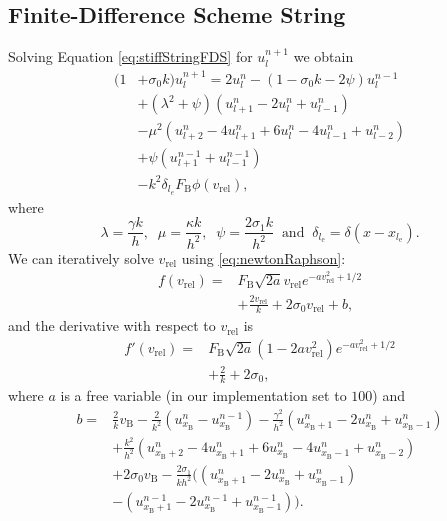 \documentclass{article}
\begin{document}
\subsection{Finite-Difference Scheme String}
Solving Equation \eqref{eq:stiffStringFDS} for $u_l^{n+1}$ we obtain
\begin{equation}
    \begin{aligned}\label{eq:stringImplementation}
        (1 &+ \sigma_0k)u_l^{n+1} = 2u_l^n - (1 - \sigma_0k - 2\psi) u_l^{n-1} \\
        & +(\lambda^2 + \psi)(u_{l+1}^n - 2u_l^n + u_{l-1}^n)\\
        &- \mu^2(u_{l+2}^n - 4u_{l+1}^n + 6u_l^n - 4u_{l-1}^n + u_{l-2}^n) \\
        &+ \psi(u_{l+1}^{n-1} + u_{l-1}^{n-1})\\
        &-k^2\delta_{l_e}F_\text{B}\phi(v_\text{rel}),
    \end{aligned}
\end{equation}
where
\begin{equation}\nonumber
\lambda = \frac{\gamma k}{h}, \;\; \mu =  \frac{\kappa k}{h^2}, \;\; \psi = \frac{2\sigma_1k}{h^2} \;\; \text{and} \;\; \delta_{l_\text{e}} = \delta(x-x_{l_\text{e}}). 
\end{equation}
We can iteratively solve $v_\text{rel}$ using \eqref{eq:newtonRaphson}:
\begin{equation}
    \begin{aligned}
    f(v_\text{rel}) = &F_\text{B} \sqrt{2a} v_\text{rel}e^{-a v_\text{rel}^2 + 1/2} \\
    &+ \frac{2 v_\text{rel}}{k} + 2 \sigma_0 v_\text{rel} + b,
    \end{aligned}
\end{equation}
and the derivative with respect to $v_\text{rel}$ is
\begin{equation}
    \begin{aligned}
    f'(v_\text{rel}) = &F_\text{B} \sqrt{2a}(1 - 2a v_\text{rel}^2) e^{-a v_\text{rel}^2 + 1/2} \\
    &+ \frac{2}{k} + 2 \sigma_0,
    \end{aligned}
\end{equation}
where $a$ is a free variable (in our implementation set to $100$) and
\begin{equation}
    \begin{aligned}
    b =&\frac{2}{k}v_\text{B} - \frac{2}{k^2}(u_{x_\text{B}}^n - u_{x_\text{B}}^{n-1}) - \frac{\gamma^2}{h^2} (u_{x_\text{B}+1}^n - 2 u_{x_\text{B}}^n + u_{x_\text{B} - 1}^n)\\
    &+ \frac{k^2}{h^2} (u_{x_\text{B}+2}^n - 4 u_{x_\text{B}+1}^n + 6 u_{x_\text{B}}^n - 4 u_{x_\text{B}-1}^n + u_{x_\text{B}-2}^n)\\
    &+ 2 \sigma_0 v_\text{B} - \frac{2 \sigma_1}{kh^2}((u_{x_\text{B}+1}^n - 2 u_{x_\text{B}}^n + u_{x_\text{B}-1}^n) \\
    &- (u_{x_\text{B}+1}^{n-1} - 2 u_{x_\text{B}}^{n-1} + u_{x_\text{B}-1}^{n-1})).
    \end{aligned}
\end{equation}
\end{document}
